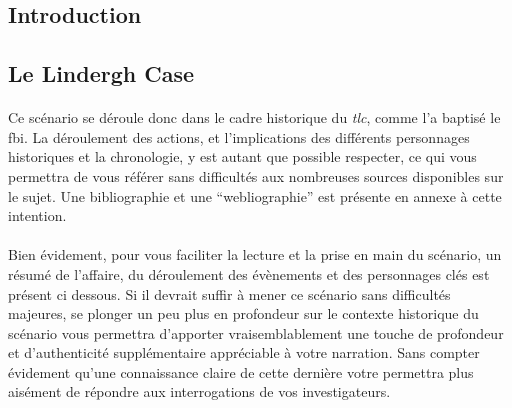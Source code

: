 \subsection{Introduction}
\subsection{Le Lindergh Case}
\paragraph{} Ce scénario se déroule donc dans le cadre historique du \emph{\gls{tlc}}, comme l'a baptisé le
\gls{fbi}. La déroulement des actions, et l'implications des différents personnages historiques et la chronologie, y est 
autant que possible respecter, ce qui vous permettra de vous référer sans difficultés aux nombreuses sources disponibles
sur le sujet. Une bibliographie et une ``webliographie'' est présente en annexe à cette intention.
\paragraph{} Bien évidement, pour vous faciliter la lecture et la prise en main du scénario, un résumé de l'affaire, du
déroulement des évènements et des personnages clés est présent ci dessous. Si il devrait suffir à mener ce scénario sans
difficultés majeures, se plonger un peu plus en profondeur sur le contexte historique du scénario vous permettra d'apporter
vraisemblablement une touche de profondeur et d'authenticité supplémentaire appréciable à votre narration. Sans compter
évidement qu'une connaissance claire de cette dernière votre permettra plus aisément de répondre aux interrogations de 
vos investigateurs.

